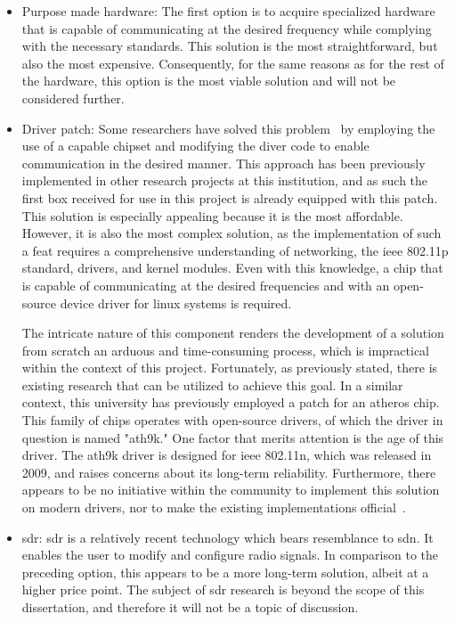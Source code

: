 \begin{itemize}
    \item Purpose made hardware: The first option is to acquire specialized hardware that is capable of communicating at the desired frequency while complying with the necessary standards. This solution is the most straightforward, but also the most expensive. Consequently, for the same reasons as for the rest of the hardware, this option is the most viable solution and will not be considered further.
    \item Driver patch: Some researchers have solved this problem~\cite{noauthor_httpsgitlabcomhpi-potsdamosmg5--linux11p--linuxid14_nodate} by employing the use of a capable chipset and modifying the diver code to enable communication in the desired manner. This approach has been previously implemented in other research projects at this institution, and as such the first box received for use in this project is already equipped with this patch.
    This solution is especially appealing because it is the most affordable. However, it is also the most complex solution, as the implementation of such a feat requires a comprehensive understanding of networking, the \gls{ieee} 802.11p standard, drivers, and kernel modules. Even with this knowledge, a chip that is capable of communicating at the desired frequencies and with an open-source device driver for linux systems is required.

    The intricate nature of this component renders the development of a solution from scratch an arduous and time-consuming process, which is impractical within the context of this project. Fortunately, as previously stated, there is existing research that can be utilized to achieve this goal. In a similar context, this university has previously employed a patch for an atheros chip. This family of chips operates with open-source drivers, of which the driver in question is named "ath9k."
    One factor that merits attention is the age of this driver. The ath9k driver is designed for \gls{ieee} 802.11n, which was released in 2009, and raises concerns about its long-term reliability. Furthermore, there appears to be no initiative within the community to implement this solution on modern drivers, nor to make the existing implementations official~\cite{noauthor_ath10k_2023}. 
    \item \gls{sdr}: \gls{sdr} is a relatively recent technology which bears resemblance to \gls{sdn}. It enables the user to modify and configure radio signals. In comparison to the preceding option, this appears to be a more long-term solution, albeit at a higher price point. The subject of \gls{sdr} research is beyond the scope of this dissertation, and therefore it will not be a topic of discussion.
\end{itemize}

